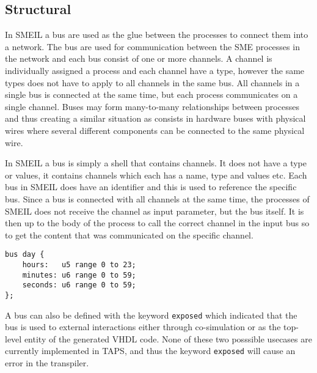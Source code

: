 \subsection{Structural}

In SMEIL a bus are used as the glue between the processes to connect them into a network. The bus are used for communication between the SME processes in the network and each bus consist of one or more channels. A channel is individually assigned a process and each channel have a type, however the same types does not have to apply to all channels in the same bus. All channels in a single bus is connected at the same time, but each process communicates on a single channel.
Buses may form many-to-many relationships between processes and thus creating a similar situation as consists in hardware buses with physical wires where several different components can be connected to the same physical wire.

In SMEIL a bus is simply a shell that contains channels. It does not have a type or values, it contains channels which each has a name, type and values etc. Each bus in SMEIL does have an identifier and this is used to reference the specific bus.
Since a bus is connected with all channels at the same time, the processes of SMEIL does not receive the channel as input parameter, but the bus itself. It is then up to the body of the process to call the correct channel in the input bus so to get the content that was communicated on the specific channel.

\begin{verbatim}
bus day {
    hours:   u5 range 0 to 23;
    minutes: u6 range 0 to 59;
    seconds: u6 range 0 to 59;
};
\end{verbatim}

A bus can also be defined with the keyword \texttt{exposed} which indicated that the bus is used to external interactions either through co-simulation or as the top-level entity of the generated VHDL code. None of these two posssible usecases are currently implemented in TAPS, and thus the keyword \texttt{exposed} will cause an error in the transpiler. %


